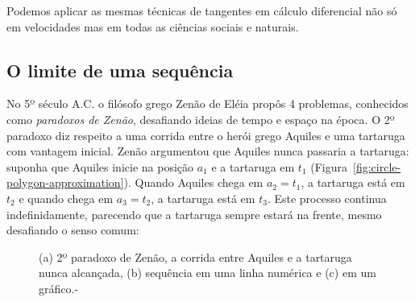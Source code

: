 Podemos aplicar as mesmas técnicas de tangentes em cálculo diferencial não só em velocidades mas em todas as ciências sociais e naturais.

\subsection{O limite de uma sequência}
No 5º século A.C. o filósofo grego Zenão de Eléia propôs 4 problemas, conhecidos como \emph{paradoxos de Zenão}, desafiando ideias de tempo e espaço na época. O 2º paradoxo diz respeito a uma corrida entre o herói grego Aquiles e uma tartaruga com vantagem inicial. Zenão argumentou que Aquiles nunca passaria a tartaruga: suponha que Aquiles inicie na posição $a_1$ e a tartaruga em $t_1$ (Figura~\ref{fig:circle-polygon-approximation}). Quando Aquiles chega em $a_2 = t_1$, a tartaruga está em $t_2$ e quando chega em $a_3=t_2$, a tartaruga está em $t_3$. Este processo continua indefinidamente, parecendo que a tartaruga sempre estará na frente, mesmo desafiando o senso comum:
\begin{figure}[!ht]
  \vspace{-.4cm}
  \centering
  \begin{minipage}[b]{0.48\columnwidth}
  	\centering
  	\vfill
  \end{minipage}
  \usebox{\measurebox}\qquad
  \caption{(a) 2º paradoxo de Zenão, a corrida entre Aquiles e a tartaruga nunca alcançada, (b) sequência em uma linha numérica e (c) em um gráfico.-}\vspace{-0.2cm}
\end{figure}

